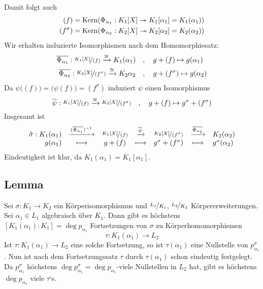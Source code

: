 Damit folgt auch
\begin{align*}
	(f) &= \operatorname{Kern} (\Phi_{\alpha_1} : K_1[X] \twoheadrightarrow K_1[\alpha_1] = K_1(\alpha_1) )\\
	(f^\sigma) &= \operatorname{Kern} (\Phi_{\alpha_2} : K_2[X] \twoheadrightarrow K_2[\alpha_2] = K_2(\alpha_2))
\end{align*}
Wir erhalten induzierte Isomorphismen nach dem Homomorphiesatz:
\begin{align*}
	\overline{\Phi_{\alpha_1}} : \nicefrac{K_1[X]}{(f)} \xrightarrow{\cong} K_1(\alpha_1) \quad &, \quad g+(f) \mapsto g(\alpha_1) \\
	\overline{\Phi_{\alpha_2}} : \nicefrac{K_2[X]}{(f^\sigma)} \xrightarrow{\cong} K_2{\alpha_2} \quad &, \quad g+ (f^\sigma) \mapsto g(\alpha_2)     
\end{align*}
Da $\psi\big((f)\big)= \big(\psi(f)\big) = (f^\sigma)$ induziert $\psi$ einen Isomorphismus
\[
	\overline{\psi} : \nicefrac{K_1[X]}{(f)} \xrightarrow{\cong} \nicefrac{K_2[X]}{(f^\sigma)} \quad , \quad g+ (f) \mapsto g^\sigma + (f^\sigma)  
\]
Insgesamt ist 
\[
	\begin{array}{rcccccl}
		\hat \sigma : K_1(\alpha_1) &\xrightarrow{(\overline{\Phi_{\alpha_1} } )^{-1}} & \nicefrac{K_1[X]}{(f)} & \xrightarrow{\overline{\psi}} & \nicefrac{K_2[X]}{(f^\sigma)} & \xrightarrow{\overline{\Phi_{\alpha_2}} }& K_2(\alpha_2) \\
		   g(\alpha_1) &\longmapsto & g+ (f) &\longmapsto &g^\sigma + (f^\sigma) &\longmapsto &g^\sigma(\alpha_2)
	\end{array}
\]
Eindeutigkeit ist klar, da $K_1(\alpha_1)=K_1[\alpha_1]$. \bewende

\subsection[Lemma: Anzahl der möglichen Fortsetzungen eines Isomorphismus von Körpern]{Lemma} %
\label{sub:1410}
Sei $\sigma : K_1 \to K_2$ ein Körperisomorphismus und $\nicefrac{L_1}{K_1}$, $\nicefrac{L_2}{K_2}$ Körpererweiterungen. Sei $\alpha_1 \in L_1$ algebraisch über $K_1$.
Dann gibt es höchstens $[K_1(\alpha_1) :K_1] = \deg p_{\alpha_1}$ Fortsetzungen von $\sigma$ zu Körperhomomorphismen
\[
	\tau : K_1(\alpha_1) \to L_2
\] 
Ist $\tau : K_1(\alpha_1) \to L_2$ eine solche Fortsetzung, so ist $\tau(\alpha_1)$ eine Nullstelle von $p_{\alpha_1}^\sigma$. Nun ist nach dem Fortsetzungssatz $\tau$
durch $\tau(\alpha_1)$ schon eindeutig festgelegt. Da $p_{\alpha_1}^\sigma$ höchstens $\deg p_{\alpha_1}^\sigma = \deg p_{\alpha_1}$-viele Nullstellen in $L_2$ hat, gibt
es höchstens $\deg p_{\alpha_1}$ viele $\tau$`s. \bewende

